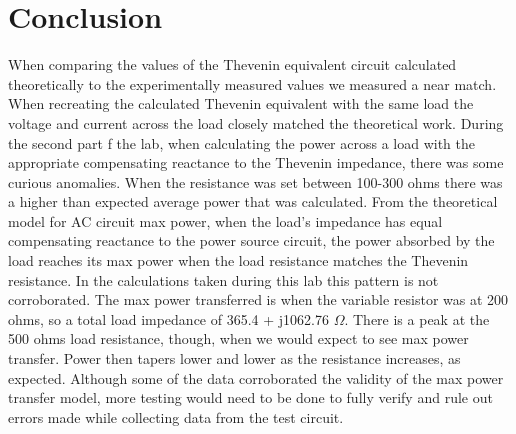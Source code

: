 \documentclass[11pt]{article}
\begin{document}
\section*{Conclusion}
When comparing the values of the Thevenin equivalent circuit calculated theoretically to the experimentally measured values we measured a near match. When recreating the calculated Thevenin equivalent with the same load the voltage and current across the load closely matched the theoretical work. During the second part f the lab, when calculating the power across a load with the appropriate compensating reactance to the Thevenin impedance, there was some curious anomalies. When the resistance was set between 100-300 ohms there was a higher than expected average power that was calculated. From the theoretical model for AC circuit max power, when the load's impedance has equal compensating reactance to the power source circuit, the power absorbed by the load reaches its max power when the load resistance matches the Thevenin resistance. In the calculations taken during this lab this pattern is not corroborated. The max power transferred is when the variable resistor was at 200 ohms, so a total load impedance of 365.4 + j1062.76 $\Omega$. There is a peak at the 500 ohms load resistance, though, when we would expect to see max power transfer. Power then tapers lower and lower as the resistance increases, as expected. Although some of the data corroborated the validity of the max power transfer model, more testing would need to be done to fully verify and rule out errors made while collecting data from the test circuit.
\end{document}
